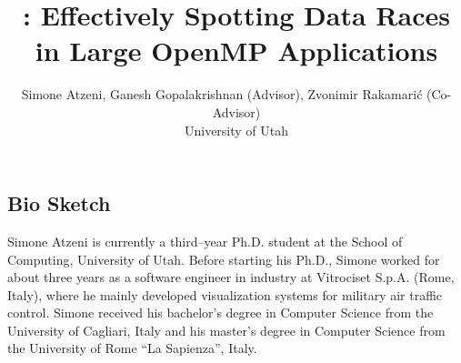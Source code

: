 \documentclass[svgnames,10pt]{article}
\title{\Large \textbf{\archer: Effectively Spotting Data Races in Large OpenMP Applications}}
\author{Simone Atzeni, Ganesh Gopalakrishnan (Advisor), Zvonimir Rakamari\'c
  (Co-Advisor)
\\University of Utah}
\date{}
\newenvironment{list2}{
  \begin{list}{$\bullet$}{%
      \setlength{\itemsep}{0in}
      \setlength{\parsep}{0in} \setlength{\parskip}{0in}
      \setlength{\topsep}{0in} \setlength{\partopsep}{0in} 
      \setlength{\leftmargin}{0.25in}}}{\end{list}}
\newcommand{\parag}{\vspace{-2.5mm}}
\begin{document}
\maketitle

\subsection{Bio Sketch}
\vspace{-6pt}
Simone Atzeni is currently a third--year Ph.D. student at the School of
Computing, University of Utah.
%
Before starting his Ph.D., Simone worked for about three years as a software
engineer in industry at Vitrociset S.p.A. (Rome, Italy), where he mainly
developed visualization systems for military air traffic control.
%
Simone received his bachelor's degree in Computer Science from the University
of Cagliari, Italy and his master's degree in Computer Science from the
University of Rome ``La Sapienza'', Italy.



\end{document}
